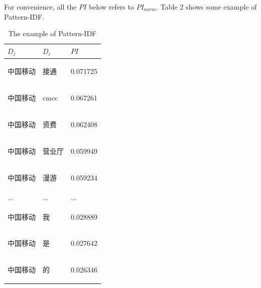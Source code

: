 \documentclass{sig-alternate}
\begin{document}
For convenience, all the $PI$ below refers to $PI_{norm}$. Table 2 shows some example of Pattern-IDF.
\begin{table}[]
\centering
\caption{The example of Pattern-IDF}
\label{my-label}
\begin{tabular}{lll}
\hline
 $D_j$ & $D_i$ & $PI$ \\ \hline
 \begin{CJK}{UTF8}{gbsn}中国移动\end{CJK} & \begin{CJK}{UTF8}{gbsn}接通\end{CJK}   & 0.071725 \\ \hline
 \begin{CJK}{UTF8}{gbsn}中国移动\end{CJK} & cmcc                                  & 0.067261 \\ \hline
 \begin{CJK}{UTF8}{gbsn}中国移动\end{CJK} & \begin{CJK}{UTF8}{gbsn}资费\end{CJK}   & 0.062408 \\ \hline
 \begin{CJK}{UTF8}{gbsn}中国移动\end{CJK} & \begin{CJK}{UTF8}{gbsn}营业厅\end{CJK} & 0.059949 \\ \hline
 \begin{CJK}{UTF8}{gbsn}中国移动\end{CJK} & \begin{CJK}{UTF8}{gbsn}漫游\end{CJK}   & 0.059234 \\ \hline
 ... & ...  & ...  \\ \hline
 \begin{CJK}{UTF8}{gbsn}中国移动\end{CJK} & \begin{CJK}{UTF8}{gbsn}我\end{CJK}    & 0.028889 \\ \hline
 \begin{CJK}{UTF8}{gbsn}中国移动\end{CJK} & \begin{CJK}{UTF8}{gbsn}是\end{CJK}    & 0.027642 \\ \hline
 \begin{CJK}{UTF8}{gbsn}中国移动\end{CJK} & \begin{CJK}{UTF8}{gbsn}的\end{CJK}    & 0.026346 \\ \hline
\end{tabular}
\end{table}
\end{document}
